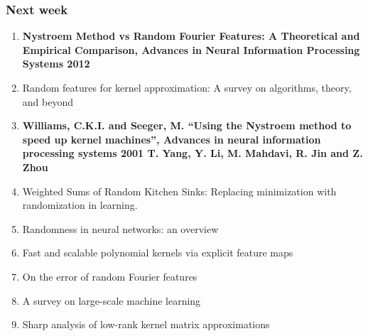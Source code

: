 \begin{frame}
  \frametitle{Next week }

  \begin{enumerate}
    \item \textbf{Nystroem Method vs Random Fourier Features: A Theoretical and Empirical Comparison, Advances in Neural Information Processing Systems 2012}
    
    \item Random features for kernel approximation: A survey on algorithms, theory, and beyond
    \item \textbf{Williams, C.K.I. and Seeger, M. “Using the Nystroem method to speed up kernel machines”, Advances in neural information processing systems 2001
    T. Yang, Y. Li, M. Mahdavi, R. Jin and Z. Zhou }
    \item Weighted Sums of Random Kitchen Sinks: Replacing minimization with randomization in learning.
    \item Randomness in neural networks: an overview
    \item Fast and scalable polynomial kernels via explicit feature maps
    \item On the error of random Fourier features
    \item A survey on large-scale machine learning
    \item Sharp analysis of low-rank kernel matrix approximations
\end{enumerate}
  

\end{frame}












